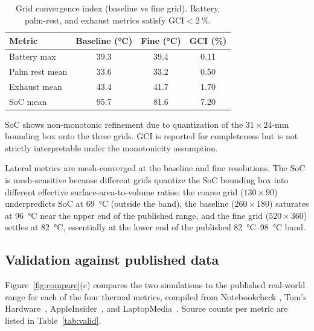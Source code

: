 \documentclass[10pt,twocolumn,letterpaper]{article}
\begin{document}
\begin{table}[!tbp]
  \centering
  \caption{Grid convergence index (baseline vs fine grid).
           Battery, palm-rest, and exhaust metrics satisfy
           $\mathrm{GCI} < \SI{2}{\percent}$.}
  \label{tab:gci}
  \small
  \begin{threeparttable}
  \begin{tabular}{@{}lccc@{}}
    \toprule
    Metric                 & Baseline (\si{\celsius})
                           & Fine (\si{\celsius})
                           & GCI (\si{\percent}) \\
    \midrule
    Battery max            & 39.3 & 39.4 & 0.11 \\
    Palm rest mean         & 33.6 & 33.2 & 0.50 \\
    Exhaust mean           & 43.4 & 41.7 & 1.70 \\
    SoC mean\tnote{$\dag$} & 95.7 & 81.6 & 7.20 \\
    \bottomrule
  \end{tabular}
  \begin{tablenotes}\footnotesize
  \item[$\dag$] SoC shows non-monotonic refinement due to
    quantization of the $31\!\times\!24$-\si{mm} bounding box onto
    the three grids. GCI is reported for completeness but is not
    strictly interpretable under the monotonicity assumption.
  \end{tablenotes}
  \end{threeparttable}
\end{table}

Lateral metrics are mesh-converged at the baseline and fine
resolutions. The SoC is mesh-sensitive because different grids
quantize the SoC bounding box into different effective
surface-area-to-volume ratios: the coarse grid ($130\!\times\!90$)
underpredicts SoC at \SI{69}{\celsius} (outside the band), the
baseline ($260\!\times\!180$) saturates at \SI{96}{\celsius} near
the upper end of the published range, and the fine grid
($520\!\times\!360$) settles at \SI{82}{\celsius}, essentially at
the lower end of the published \SIrange{82}{98}{\celsius} band.

\subsection{Validation against published data}
\label{sec:rvalid}

Figure~\ref{fig:compare}(c) compares the two simulations to the
published real-world range for each of the four thermal metrics,
compiled from Notebookcheck
\cite{notebookcheck2019,notebookcheck2021pro,notebookcheck2021max},
Tom's Hardware~\cite{toms2021}, AppleInsider~\cite{appleinsider2019},
and LaptopMedia~\cite{laptopmedia2021}. Source counts per metric
are listed in Table~\ref{tab:valid}.
\end{document}
